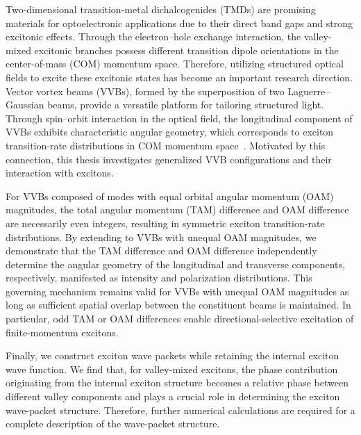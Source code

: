 
\begin{enAbstract}
Two-dimensional transition-metal dichalcogenides (TMDs) are promising materials for optoelectronic applications due to their direct band gaps and strong excitonic effects. Through the electron–hole exchange interaction, the valley-mixed excitonic branches possess different transition dipole orientations in the center-of-mass (COM) momentum space. Therefore, utilizing structured optical fields to excite these excitonic states has become an important research direction. Vector vortex beams (VVBs), formed by the superposition of two Laguerre–Gaussian beams, provide a versatile platform for tailoring structured light. Through spin–orbit interaction in the optical field, the longitudinal component of VVBs exhibits characteristic angular geometry, which corresponds to exciton transition-rate distributions in COM momentum space~\cite{sanchez2024enhanced}. Motivated by this connection, this thesis investigates generalized VVB configurations and their interaction with excitons.

For VVBs composed of modes with equal orbital angular momentum (OAM) magnitudes, the total angular momentum (TAM) difference and OAM difference are necessarily even integers, resulting in symmetric exciton transition-rate distributions. By extending to VVBs with unequal OAM magnitudes, we demonstrate that the TAM difference and OAM difference independently determine the angular geometry of the longitudinal and transverse components, respectively, manifested as intensity and polarization distributions. This governing mechanism remains valid for VVBs with unequal OAM magnitudes as long as sufficient spatial overlap between the constituent beams is maintained. In particular, odd TAM or OAM differences enable directional-selective excitation of finite-momentum excitons.

Finally, we construct exciton wave packets while retaining the internal exciton wave function. We find that, for valley-mixed excitons, the phase contribution originating from the internal exciton structure becomes a relative phase between different valley components and plays a crucial role in determining the exciton wave-packet structure. Therefore, further numerical calculations are required for a complete description of the wave-packet structure.
    \enAbsKeywords
\end{enAbstract}





